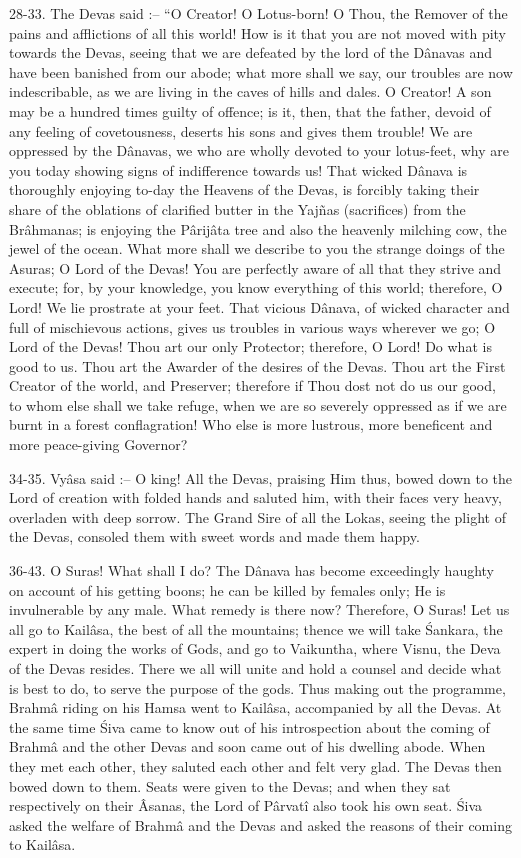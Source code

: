 28-33. The Devas said :-- ``O Creator! O Lotus-born! O Thou, the Remover of the pains and afflictions of all this world! How is it that you are not moved with pity towards the Devas, seeing that we are defeated by the lord of the D\^anavas and have been banished from our abode; what more shall we say, our troubles are now indescribable, as we are living in the caves of hills and dales. O Creator! A son may be a hundred times guilty of offence; is it, then, that the father, devoid of any feeling of covetousness, deserts his sons and gives them trouble! We are oppressed by the D\^anavas, we who are wholly devoted to your lotus-feet, why are you today showing signs of indifference towards us! That wicked D\^anava is thoroughly enjoying to-day the Heavens of the Devas, is forcibly taking their share of the oblations of clarified butter in the Yajñas (sacrifices) from the Br\^ahmanas; is enjoying the P\^arij\^ata tree and also the heavenly milching cow, the jewel of the ocean. What more shall we describe to you the strange doings of the Asuras; O Lord of the Devas! You are perfectly aware of all that they strive and execute; for, by your knowledge, you know everything of this world; therefore, O Lord! We lie prostrate at your feet. That vicious D\^anava, of wicked character and full of mischievous actions, gives us troubles in various ways wherever we go; O Lord of the Devas! Thou art our only Protector; therefore, O Lord! Do what is good to us. Thou art the Awarder of the desires of the Devas. Thou art the First Creator of the world, and Preserver; therefore if Thou dost not do us our good, to whom else shall we take refuge, when we are so severely oppressed as if we are burnt in a forest conflagration! Who else is more lustrous, more beneficent and more peace-giving Governor?

34-35. Vy\^asa said :-- O king! All the Devas, praising Him thus, bowed down to the Lord of creation with folded hands and saluted him, with their faces very heavy, overladen with deep sorrow. The Grand Sire of all the Lokas, seeing the plight of the Devas, consoled them with sweet words and made them happy.

36-43. O Suras! What shall I do? The D\^anava has become exceedingly haughty on account of his getting boons; he can be killed by females only; He is invulnerable by any male. What remedy is there now? Therefore, O Suras! Let us all go to Kail\^asa, the best of all the mountains; thence we will take \'Sankara, the expert in doing the works of Gods, and go to Vaikuntha, where Visnu, the Deva of the Devas resides. There we all will unite and hold a counsel and decide what is best to do, to serve the purpose of the gods. Thus making out the programme, Brahm\^a riding on his Hamsa went to Kail\^asa, accompanied by all the Devas. At the same time \'Siva came to know out of his introspection about the coming of Brahm\^a and the other Devas and soon came out of his dwelling abode. When they met each other, they saluted each other and felt very glad. The Devas then bowed down to them. Seats were given to the Devas; and when they sat respectively on their \^Asanas, the Lord of P\^arvat\^i also took his own seat. \'Siva asked the welfare of Brahm\^a and the Devas and asked the reasons of their coming to Kail\^asa.


